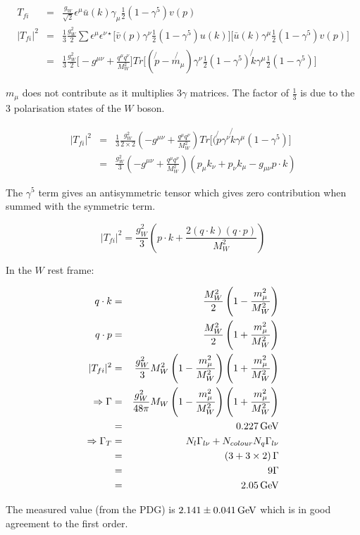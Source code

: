 \begin{eqnarray*}
  T_{fi} & = & \frac{g_W}{\sqrt{2}}\epsilon^{\mu}\bar{u}(k)\gamma_{\mu}\frac{1}{2}\left(1 - \gamma^5\right)v(p) \\
  |T_{fi}|^2 & = & \frac{1}{3}\frac{g_W^2}{2}\sum\epsilon^{\mu}\epsilon^{\nu \star}\Big[\bar{v}(p)\gamma^{\nu}\frac{1}{2}\left(1 - \gamma^5\right)u(k)\Big]\Big[\bar{u}(k)\gamma^{\mu}\frac{1}{2}\left(1 - \gamma^5\right)v(p)\Big] \\
  & = & \frac{1}{3}\frac{g_W^2}{2}\Big[ -g^{\mu\nu} + \frac{q^{\mu}q^{\nu}}{M^2_W}\Big]Tr\Big[\left(\not{p} - \not{m_{\mu}}\right)\gamma^{\nu}\frac{1}{2}\left(1 - \gamma^5\right)\not{k}\gamma^{\mu}\frac{1}{2}\left(1 - \gamma^5\right)\Big]
\end{eqnarray*}

$m_{\mu}$ does not contribute as it multiplies $3\gamma$ matrices.  The factor of $\frac{1}{3}$ is due to the $3$ polarisation states of the $W$ boson.

\begin{eqnarray*}
  |T_{fi}|^2 & = & \frac{1}{3}\frac{g^2_W}{2\times 2}\left(-g^{\mu\nu} + \frac{q^{\mu}q^{\nu}}{M^2_W}\right) Tr\Big[(\not{p}\gamma^{\nu}\not{k}\gamma^{\mu}\left(1 - \gamma^5\right)\Big] \\
  & = & \frac{g^2_W}{3}\left(-g^{\mu\nu} + \frac{q^{\mu}q^{\nu}}{M^2_W}\right)\left(p_{\mu}k_{\nu} + p_{\nu}k_{\mu} - g_{\mu\nu}p\cdot k\right)
\end{eqnarray*}

The $\gamma^5$ term gives an antisymmetric tensor which gives zero contribution when summed with the symmetric term.

\[
  |T_{fi}|^2 = \frac{g^2_W}{3}\left(p\cdot k + \frac{2\left(q\cdot k\right)\left(q\cdot p\right)}{M^2_W}\right)
\]

In the $W$ rest frame:

\begin{eqnarray*}
  q\cdot k & = & \frac{M^2_W}{2}\left(1 - \frac{m^2_{\mu}}{M^2_W}\right) \\
  q\cdot p & = & \frac{M^2_W}{2}\left(1 + \frac{m^2_{\mu}}{M^2_W}\right) \\
  |T_{fi}|^2 & = & \frac{g^2_W}{3}M^2_W\left(1 - \frac{m^2_{\mu}}{M^2_W}\right)\left(1 + \frac{m^2_{\mu}}{M^2_W}\right) \\
  \Rightarrow \Gamma & = & \frac{g^2_W}{48\pi}M_W \left(1 - \frac{m^2_{\mu}}{M^2_W}\right)\left(1 + \frac{m^2_{\mu}}{M^2_W}\right) \\
  & = & 0.227 \mathrm{\,GeV} \\
  \Rightarrow \Gamma_T & = & N_l \Gamma_{l\nu} + N_{colour}N_q\Gamma_{l\nu} \\
  & = & \left(3 + 3\times2\right)\Gamma \\
  & = & 9\Gamma \\
  & = & 2.05 \mathrm{\,GeV}
\end{eqnarray*}

The measured value (from the PDG) is $2.141 \pm 0.041 \mathrm{\,GeV}$ which is in good agreement to the first order.
